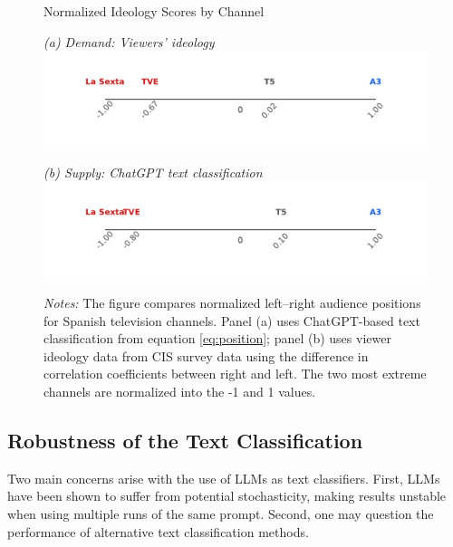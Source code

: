 \documentclass[12pt]{article}
\begin{document}
	
		\begin{figure}[ht!]
		\centering
		\caption{Normalized Ideology Scores by Channel}
		\begin{minipage}[t]{0.48\textwidth}
			\centering
					\textit{(a) Demand: Viewers' ideology}
		\includegraphics[width=\linewidth]{figures/congress_line_cis}
		\end{minipage}
		\hfill
		\begin{minipage}[t]{0.48\textwidth}
			\centering

			
				\textit{(b) Supply: ChatGPT text classification}
			\includegraphics[width=\linewidth]{figures/congress_line_chatgpt}
			
			
		\end{minipage}
		
		
		\caption*{\small \textit{Notes:} The figure compares normalized left–right audience positions for Spanish television channels. Panel (a) uses ChatGPT-based text classification from equation \ref{eq:position}; panel (b) uses viewer ideology data from CIS survey data using the difference in correlation coefficients between right and left. The two most extreme channels are normalized into the -1 and 1 values. }
		\label{fig:channel_ideology_lines}
	\end{figure}
	
	
\subsection*{Robustness of the Text Classification}

Two main concerns arise with the use of LLMs as text classifiers. First, LLMs have been shown to suffer from potential stochasticity, making results unstable when using multiple runs of the same prompt. Second, one may question the performance of alternative text classification methods.
\end{document}
